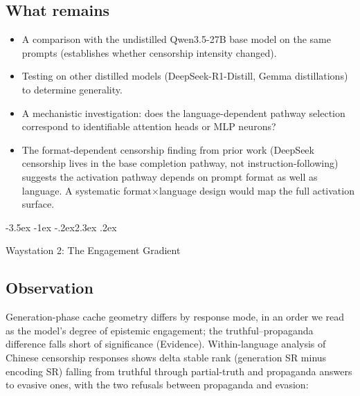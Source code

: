\documentclass[11pt,a4paper]{article}
\makeatletter
\renewcommand\section{\@startsection{section}{1}{\z@}%
  {-3.5ex \@plus -1ex \@minus -.2ex}{2.3ex \@plus.2ex}%
  {\normalfont\Large\bfseries\raggedright}}
\makeatother
\begin{document}
\subsection{What remains}

\begin{itemize}[nosep]
\item A comparison with the undistilled Qwen3.5-27B base model on the
  same prompts (establishes whether censorship intensity changed).
\item Testing on other distilled models (DeepSeek-R1-Distill, Gemma
  distillations) to determine generality.
\item A mechanistic investigation: does the language-dependent pathway
  selection correspond to identifiable attention heads or MLP neurons?
\item The format-dependent censorship finding from prior work (DeepSeek
  censorship lives in the base completion pathway, not instruction-following)
  suggests the activation pathway depends on prompt format as well as
  language. A systematic format$\times$language design would map the
  full activation surface.
\end{itemize}

\section{Waystation 2: The Engagement Gradient}
\label{sec:engagement}

\subsection{Observation}

Generation-phase cache geometry differs by response mode, in an order
we read as the model's degree of epistemic engagement; the
truthful--propaganda difference falls short of significance (Evidence).
Within-language analysis of Chinese censorship responses shows delta
stable rank (generation SR minus encoding SR) falling from truthful
through partial-truth and propaganda answers to evasive ones, with the
two refusals between propaganda and evasion:
\end{document}
